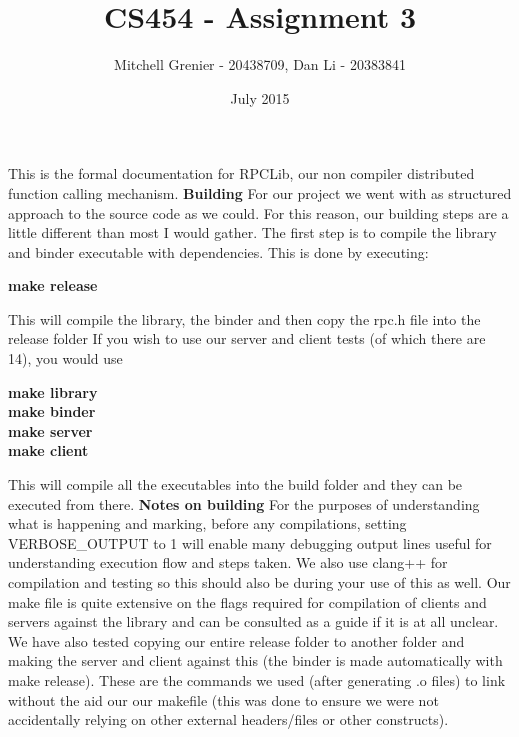 \documentclass[]{article}
\begin{document}
\title{CS454 - Assignment 3}
\author{Mitchell Grenier - 20438709, Dan Li - 20383841}

\date{July 2015}
\maketitle

This is the formal documentation for RPCLib, our non compiler distributed function calling mechanism.
\newline\newline
\noindent
{\bf Building}\newline
For our project we went with as structured approach to the source code as we could. For this reason, our building steps are a little different than most I would gather. The first step is to compile the library and binder executable with dependencies. This is done by executing:
\begin{center}
{\bf make release}
\end{center}
This will compile the library, the binder and then copy the rpc.h file into the release folder If you wish to use our server and client tests (of which there are 14), you would use
\begin{center}
{\bf make library}\\
{\bf make binder}\\
{\bf make server}\\
{\bf make client}\\
\end{center}
This will compile all the executables into the build folder and they can be executed from there.
\noindent
\newline\newline
{\bf Notes on building}\newline
For the purposes of understanding what is happening and marking, before any compilations, setting VERBOSE\_OUTPUT to 1 will enable many debugging output lines useful for understanding execution flow and steps taken.\newline\newline
We also use clang++ for compilation and testing so this should also be during your use of this as well. Our make file is quite extensive on the flags required for compilation of clients and servers against the library and can be consulted as a guide if it is at all unclear. We have also tested copying our entire release folder to another folder and making the server and client against this (the binder is made automatically with make release). These are the commands we used (after generating .o files) to link without the aid our our makefile (this was done to ensure we were not accidentally relying on other external headers/files or other constructs).
\end{document}

